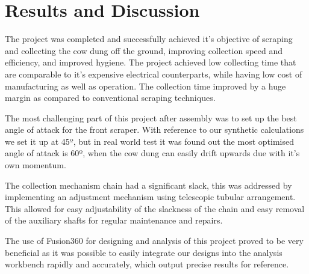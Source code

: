 \chapter{Results and Discussion} \label{Results and Discussion}

The project was completed and successfully achieved it's objective of scraping and collecting the cow dung off the ground, improving collection speed and efficiency, and improved hygiene. The project achieved low collecting time that are comparable to it's expensive electrical counterparts, while having low cost of manufacturing as well as operation. The collection time improved by a huge margin as compared to conventional scraping techniques.

The most challenging part of this project after assembly was to set up the best angle of attack for the front scraper. With reference to our synthetic calculations we set it up at 45º, but in real world test it was found out the most optimised angle of attack is 60º, when the cow dung can easily drift upwards due with it's own momentum. 

The collection mechanism chain had a significant slack, this was addressed by implementing an adjustment mechanism using telescopic tubular arrangement. This allowed for easy adjustability of the slackness of the chain and easy removal of the auxiliary shafts for regular maintenance and repairs.

The use of Fusion360 for designing and analysis of this project proved to be very beneficial as it was possible to easily integrate our designs into the analysis workbench rapidly and accurately, which output precise results for reference.


